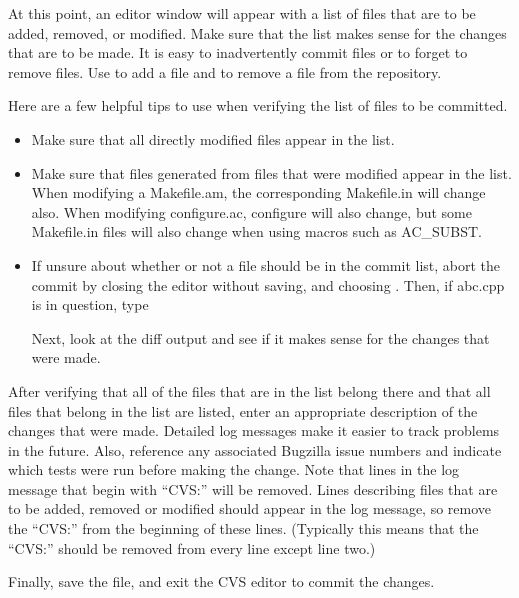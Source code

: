 \documentclass[12pt,relax]{TrilinosDevGuide}
\begin{document}
\begin{itemize}

At this point, an editor window will appear with a list of files that are to 
be added, removed, or modified.  Make sure that the list makes sense for the 
changes that are to be made.  It is easy to inadvertently commit files or to 
forget to remove files.  Use  to add a file and
 to remove a file from the repository.  

Here are a few helpful tips to use when verifying the list of files 
to be committed.  
\begin{itemize}
\item Make sure that all directly modified files appear in the list.  
\item Make sure that files generated from files that were modified 
appear in the list.  When modifying a Makefile.am, the corresponding 
Makefile.in will change also.  When modifying configure.ac, configure will 
also change, but some Makefile.in files will also change when using macros 
such as AC\_SUBST.  
\item If unsure about whether or not a 
file should be in the commit list, abort the commit by closing the editor 
without saving, and choosing .  Then, if abc.cpp is in 
question, type 


Next, look at the diff output and see if it makes sense for the changes that 
were made.  

\end{itemize}

After verifying that all of the files that are in the list belong 
there and that all files that belong in the list are listed, enter an 
appropriate description of the changes that were made.  Detailed log 
messages make it easier to track problems in the future.  Also, reference any 
associated Bugzilla issue numbers and indicate which tests were run before 
making the change.  Note that lines in the log message that begin with 
``CVS:'' will be removed.  Lines describing files that are to be added, 
removed or modified should appear in the log message, so remove the ``CVS:'' 
from the beginning of these lines.  (Typically this means that the ``CVS:'' 
should be removed from every line except line two.)

Finally, save the file, and exit the CVS editor to commit the changes.


\end{itemize}
\end{document}
